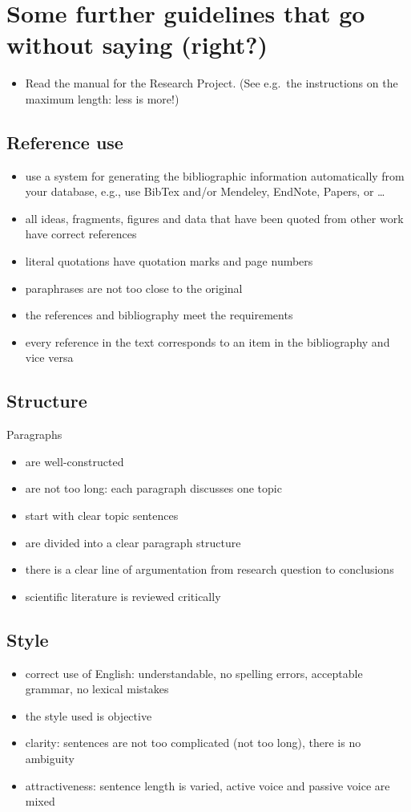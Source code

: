 \appendix
\section{Some further guidelines that go without saying (right?)}

\begin{itemize}
\item Read the manual for the Research Project. (See e.g.\ the instructions on the maximum length: less is more!)
\end{itemize}

\subsection{Reference use}
\begin{itemize}
\item use a system for generating the bibliographic information automatically from your database, e.g., use BibTex and/or Mendeley, EndNote, Papers, or \ldots
\item all ideas, fragments, figures and data that have been quoted from other work have correct references
\item literal quotations have quotation marks and page numbers
\item paraphrases are not too close to the original
\item the references and bibliography meet the requirements
\item every reference in the text corresponds to an item in the bibliography and vice versa
\end{itemize}

\subsection{Structure}
Paragraphs
\begin{itemize}
\item are well-constructed
\item are not too long: each paragraph discusses one topic
\item start with clear topic sentences
\item are divided into a clear paragraph structure
\item there is a clear line of argumentation from research question to conclusions
\item scientific literature is reviewed critically
\end{itemize}

\subsection{Style}
\begin{itemize}
\item correct use of English: understandable, no spelling errors, acceptable grammar, no lexical mistakes 
\item the style used is objective
\item clarity: sentences are not too complicated (not too long), there is no ambiguity
\item attractiveness: sentence length is varied, active voice and passive voice are mixed
\end{itemize}

